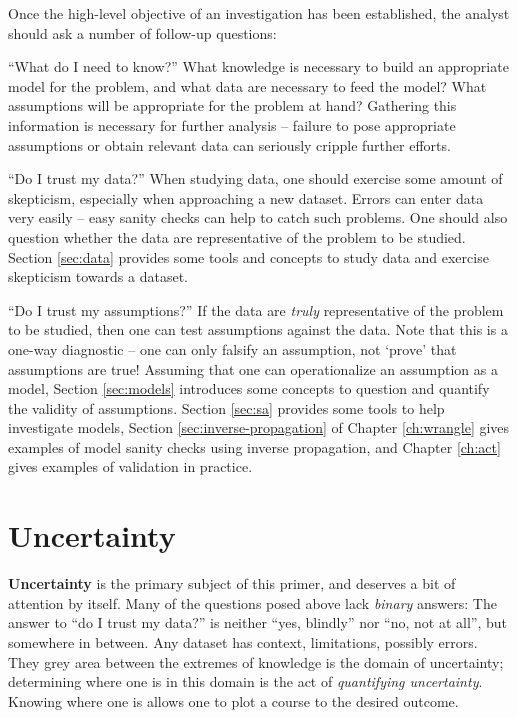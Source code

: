 \documentclass[../primer.tex]{subfiles}
\begin{document}
Once the high-level objective of an investigation has been established, the
analyst should ask a number of follow-up questions:

``What do I need to know?'' What knowledge is necessary to build an appropriate
model for the problem, and what data are necessary to feed the model? What
assumptions will be appropriate for the problem at hand? Gathering this
information is necessary for further analysis -- failure to pose appropriate
assumptions or obtain relevant data can seriously cripple further efforts.

``Do I trust my data?'' When studying data, one should exercise some amount of
skepticism, especially when approaching a new dataset. Errors can enter data
very easily -- easy sanity checks can help to catch such problems. One should
also question whether the data are representative of the problem to be studied.
Section \ref{sec:data} provides some tools and concepts to study data and
exercise skepticism towards a dataset.

``Do I trust my assumptions?'' If the data are \emph{truly} representative of
the problem to be studied, then one can test assumptions against the data. Note
that this is a one-way diagnostic -- one can only falsify an assumption, not
`prove' that assumptions are true! Assuming that one can operationalize an
assumption as a model, Section \ref{sec:models} introduces some concepts to
question and quantify the validity of assumptions. Section \ref{sec:sa} provides
some tools to help investigate models, Section \ref{sec:inverse-propagation} of
Chapter \ref{ch:wrangle} gives examples of model sanity checks using inverse
propagation, and Chapter \ref{ch:act} gives examples of validation in practice.

\section{Uncertainty} \label{sec:uncertainty}
\textbf{Uncertainty} is the primary subject of this primer, and deserves a bit
of attention by itself. Many of the questions posed above lack \emph{binary}
answers: The answer to ``do I trust my data?'' is neither ``yes, blindly'' nor
``no, not at all'', but somewhere in between. Any dataset has context,
limitations, possibly errors. They grey area between the extremes of knowledge
is the domain of uncertainty; determining where one is in this domain is the act
of \emph{quantifying uncertainty}. Knowing where one is allows one to plot a
course to the desired outcome.
\end{document}
